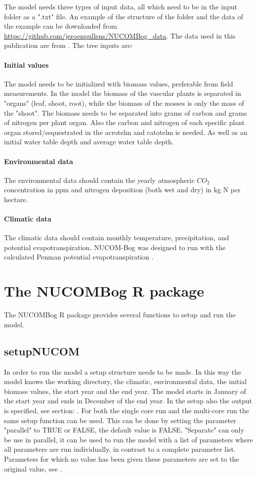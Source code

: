 \documentclass{article}\usepackage[]{graphicx}\usepackage[]{color}
\begin{document}
The model needs three types of input data, all which need to be in the input folder as a ".txt" file.
An example of the structure of the folder and the data of the example can be downloaded from \url{https://github.com/jeroenpullens/NUCOMBog_data}. The data used in this publication are from \cite{Heijmans2008a}. The tree inputs are:

\paragraph{Initial values}
The model needs to be initialized with biomass values, preferable from field measurements. In the model the biomass of the vascular plants is separated in "organs" (leaf, shoot, root), while the biomass of the mosses is only the mass of the "shoot". The biomass needs to be separated into grams of carbon and grams of nitrogen per plant organ. Also the carbon and nitrogen of each specific plant organ stored/sequestrated in the acrotelm and catotelm is needed. As well as an initial water table depth and average water table depth.

\paragraph{Environmental data}
The environmental data should contain the yearly atmospheric ${CO_2}$ concentration in ppm and nitrogen deposition (both wet and dry) in kg N per hectare.

\paragraph{Climatic data}
The climatic data should contain monthly temperature, precipitation, and potential evapotranspiration. NUCOM-Bog was designed to run with the calculated Penman potential evapotranspiration \citep{Penman1946}.

\section{The NUCOMBog R package}
The NUCOMBog R package provides several functions to setup and run the model.

\subsection*{setupNUCOM} \label{ssec:setupNUCOM}
In order to run the model a setup structure needs to be made. In this way the model knows the working directory, the climatic, environmental data, the initial biomass values, the start year and the end year. The model starts in January of the start year and ends in December of the end year. In the setup also the output is specified, see section: . For both the single core run and the multi-core run the same setup function can be used. This can be done by setting the parameter "parallel" to TRUE or FALSE, the default value is FALSE. "Separate" can only be use in parallel, it can be used to run the model with a list of parameters where all parameters are run individually, in contrast to a complete parameter list. Parameters for which no value has been given these parameters are set to the original value, see .
\end{document}
